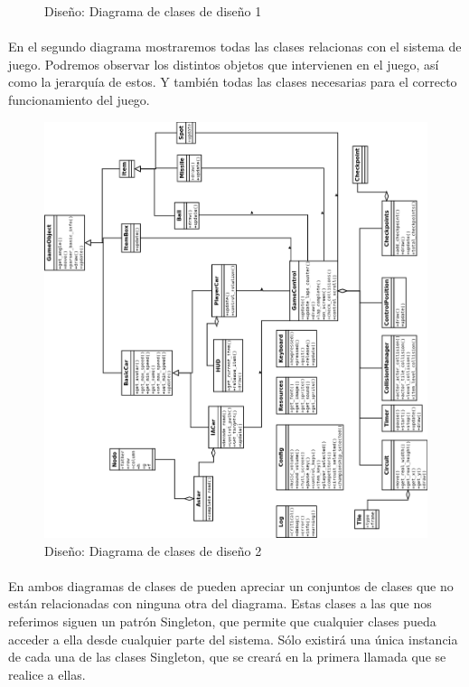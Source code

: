\begin{figure}[H]
\begin{center}
  \end{center}
  \caption{Diseño: Diagrama de clases de diseño 1}
\end{figure}

\paragraph{}
En el segundo diagrama mostraremos todas las clases relacionas con el sistema de juego. Podremos observar los distintos objetos que
intervienen en el juego, así como la jerarquía de estos. Y también todas las clases necesarias para el correcto funcionamiento del
juego.

\begin{figure}[H]
  \label{diagrama_clases_diseno}
  \begin{center}
    \includegraphics[scale=0.45]{imagenes/diseno/diagrama_clases_diseno2.png}
  \end{center}
  \caption{Diseño: Diagrama de clases de diseño 2}
\end{figure}

\paragraph{}
En ambos diagramas de clases de pueden apreciar un conjuntos de clases que no
están relacionadas con ninguna otra del diagrama. 
Estas clases a las que nos referimos siguen un patrón Singleton, que permite que cualquier clases pueda acceder a ella
desde cualquier parte del sistema. Sólo existirá una única instancia de cada una de las clases Singleton, que se creará en la 
primera llamada que se realice a ellas.
